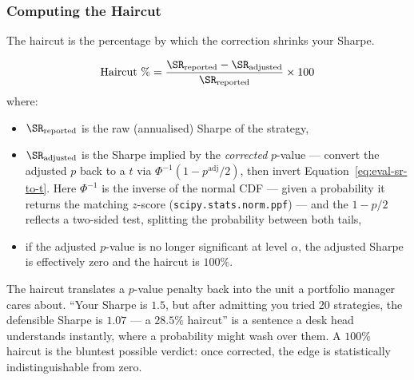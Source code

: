 \subsubsection{Computing the Haircut}

The haircut is the percentage by which the correction shrinks your Sharpe.

\begin{equation}
\label{eq:eval-haircut-pct}
\text{Haircut \%} = \frac{\SR_{\text{reported}} - \SR_{\text{adjusted}}}{\SR_{\text{reported}}} \times 100
\end{equation}
where:
\begin{itemize}[nosep]
  \item $\SR_{\text{reported}}$ is the raw (annualised) Sharpe of the strategy,
  \item $\SR_{\text{adjusted}}$ is the Sharpe implied by the \emph{corrected} $p$-value --- convert the adjusted $p$ back to a $t$ via $\Phi^{-1}(1 - p^{\text{adj}}/2)$, then invert Equation~\eqref{eq:eval-sr-to-t}. Here $\Phi^{-1}$ is the inverse of the normal CDF --- given a probability it returns the matching $z$-score (\texttt{scipy.stats.norm.ppf}) --- and the $1 - p/2$ reflects a two-sided test, splitting the probability between both tails,
  \item if the adjusted $p$-value is no longer significant at level $\alpha$, the adjusted Sharpe is effectively zero and the haircut is $100\%$.
\end{itemize}

\begin{intuition}
The haircut translates a $p$-value penalty back into the unit a portfolio manager cares about.
``Your Sharpe is $1.5$, but after admitting you tried 20 strategies, the defensible Sharpe is $1.07$ --- a $28.5\%$ haircut'' is a sentence a desk head understands instantly, where a probability might wash over them.
A $100\%$ haircut is the bluntest possible verdict: once corrected, the edge is statistically indistinguishable from zero.
\end{intuition}

